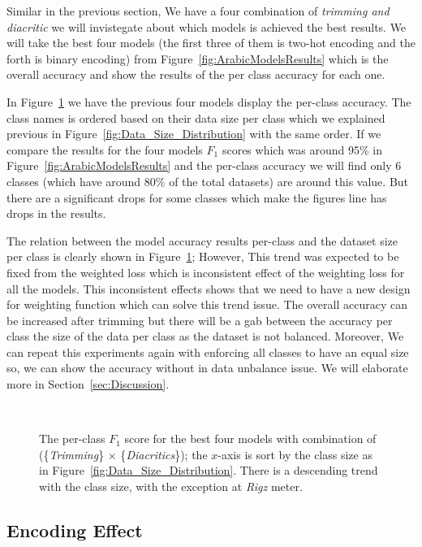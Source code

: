 Similar in the previous section, We have a four combination of \textit{trimming and diacritic} we will invistegate about which models is achieved the best results. We will take the best four models (the first three of them is two-hot encoding and the forth is binary encoding) from Figure~\ref{fig:ArabicModelsResults} which is the overall accuracy and show the results of the per class accuracy for each one.

In Figure~\ref{fig:Results_Per_Class} we have the previous four models display the per-class accuracy. The class names is ordered based on their data size per class which we explained previous in Figure~\ref{fig:Data_Size_Distribution} with the same order. If we compare the results for the four models $F_1$ scores which was around 95\% in Figure~\ref{fig:ArabicModelsResults} and the per-class accuracy we will find only 6 classes (which have around 80\% of the total datasets) are around this value. But there are a significant drops for some classes which make the figures line has drops in the results.

The relation between the model accuracy results per-class and the dataset size per class is clearly shown in Figure~\ref{fig:Results_Per_Class}; However, This trend was expected to be fixed from the weighted loss which is inconsistent effect of the weighting loss for all the models. This inconsistent effects shows that we need to have a new design for weighting function which can solve this trend issue. The overall accuracy can be increased after trimming but there will be a gab between the accuracy per class the size of the data per class as the dataset is not balanced. Moreover, We can repeat this experiments again with enforcing all classes to have an equal size so, we can show the accuracy without in data unbalance issue. We will elaborate more in Section~\ref{sec:Discussion}.



\begin{figure}[!t]
 
 \caption{The per-class $F_1$ score for the best four models with combination of (\{\textit{Trimming}\} $\times$ \{\textit{Diacritics}\}); the $x$-axis is sort by the class size as in Figure~\ref{fig:Data_Size_Distribution}. There is a descending trend with the class size, with the exception at \textit{Rigz} meter.}~\label{fig:Results_Per_Class}
\end{figure}



\subsection{Encoding Effect}

